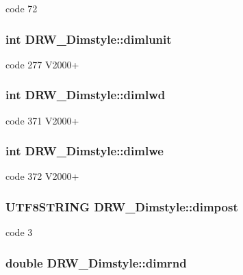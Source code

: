 code 72 \hypertarget{classDRW__Dimstyle_a3e2bc803306737f75c7a0390c0dbc5cd}{
\subsubsection[{dimlunit}]{\setlength{\rightskip}{0pt plus 5cm}int D\-R\-W\-\_\-\-Dimstyle\-::dimlunit}}\label{classDRW__Dimstyle_a3e2bc803306737f75c7a0390c0dbc5cd}
code 277 V2000+ \hypertarget{classDRW__Dimstyle_a1547ae00544ee4cc865e30847220b5a3}{
\subsubsection[{dimlwd}]{\setlength{\rightskip}{0pt plus 5cm}int D\-R\-W\-\_\-\-Dimstyle\-::dimlwd}}\label{classDRW__Dimstyle_a1547ae00544ee4cc865e30847220b5a3}
code 371 V2000+ \hypertarget{classDRW__Dimstyle_a25f9fed17c3cbd6f0969d85a0fc42df4}{
\subsubsection[{dimlwe}]{\setlength{\rightskip}{0pt plus 5cm}int D\-R\-W\-\_\-\-Dimstyle\-::dimlwe}}\label{classDRW__Dimstyle_a25f9fed17c3cbd6f0969d85a0fc42df4}
code 372 V2000+ \hypertarget{classDRW__Dimstyle_ab4484303cfced1d7ad3c19a84b19dada}{
\subsubsection[{dimpost}]{\setlength{\rightskip}{0pt plus 5cm}U\-T\-F8\-S\-T\-R\-I\-N\-G D\-R\-W\-\_\-\-Dimstyle\-::dimpost}}\label{classDRW__Dimstyle_ab4484303cfced1d7ad3c19a84b19dada}
code 3 \hypertarget{classDRW__Dimstyle_abe4aea95c5bf8eca979c33d94ea2bb07}{
\subsubsection[{dimrnd}]{\setlength{\rightskip}{0pt plus 5cm}double D\-R\-W\-\_\-\-Dimstyle\-::dimrnd}}\label{classDRW__Dimstyle_abe4aea95c5bf8eca979c33d94ea2bb07}
